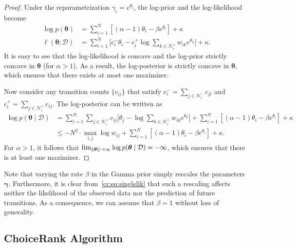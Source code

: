 \begin{proof}
Under the reparametrization $\gamma_i = e^{\theta_i}$, the log-prior and the log-likelihood become
\begin{align*}
\log p(\bm{\theta})
    &= \sum_{i = 1}^N \left[ (\alpha - 1) \theta_i - \beta e^{\theta_i} \right] + \kappa \\
\ell(\bm{\theta} ; \mathcal{D})
    &= \sum_{i = 1}^N \bigg[ c^-_i \theta_i - c^+_i \log \sum_{k \in \mathcal{N}^+_i} w_{ik} e^{\theta_k} \bigg] + \kappa.
\end{align*}
It is easy to see that the log-likelihood is concave and the log-prior strictly concave in $\bm{\theta}$ (for $\alpha > 1$).
As a result, the log-posterior is strictly concave in $\bm{\theta}$, which ensures that there exists at most one maximizer.

Now consider any transition counts $\{ c_{ij} \}$ that satisfy $c^-_i = \sum_{j \in \mathcal{N}^-_i} c_{ji}$ and $c^+_i = \sum_{j \in \mathcal{N}^+_i} c_{ij}$.
The log-posterior can be written as
\begin{align*}
\log p(\bm{\theta} \mid \mathcal{D})
    &= \sum_{i = 1}^N \sum_{j \in \mathcal{N}^+_i} c_{ij} \bigg[ \theta_j - \log \sum_{k \in \mathcal{N}^+_i} w_{ik} e^{\theta_k} \bigg]
       + \sum_{i = 1}^N \left[ (\alpha - 1) \theta_i - \beta e^{\theta_i} \right] + \kappa\\
    &\le -N^2 \cdot \max_{i,j} \log w_{ij}
       + \sum_{i = 1}^N \left[ (\alpha - 1) \theta_i - \beta e^{\theta_i} \right] + \kappa.
\end{align*}
For $\alpha > 1$, it follows that $\lim_{\lVert\bm{\theta}\rVert \to \infty} \log p(\bm{\theta} \mid \mathcal{D}) = -\infty$, which ensures that there is at least one maximizer.
\end{proof}

Note that varying the rate $\beta$ in the Gamma prior simply rescales the parameters $\bm{\gamma}$.
Furthermore, it is clear from~\eqref{cr:eq:singlelik} that such a rescaling affects neither the likelihood of the observed data nor the prediction of future transitions.
As a consequence, we can assume that $\beta = 1$ without loss of generality.

\subsection{ChoiceRank Algorithm}  %
\label{cr:sec:algorithm}

